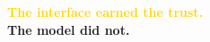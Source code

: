 \documentclass[aspectratio=169,11pt]{beamer}
\begin{document}
{
\begin{frame}[plain]
\vfill
\begin{center}
{\huge\bfseries\textcolor{Gold}{The interface earned the trust.}}\\[0.8cm]
{\huge\bfseries\textcolor{SoftWhite}{The model \alert{did not}.}}
\end{center}
\vfill
\end{frame}}
\end{document}
